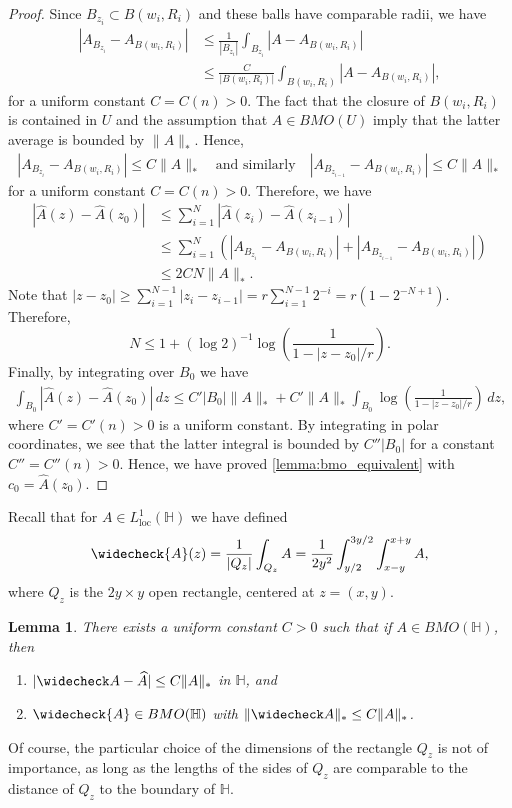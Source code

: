 \documentclass{amsart}
\theoremstyle{plain}
\newtheorem{lemma}[theorem]{Lemma}
\theoremstyle{definition}
\theoremstyle{remark}
\numberwithin{equation}{section}
\numberwithin{theorem}{section}
\numberwithin{conjecture}{section}
\newcommand{\1}{\mathbf 1}
\newcommand{\UHP}{\mathbb H}
\DeclareMathOperator{\loc}{\mathrm{loc}}
\begin{document}
\begin{proof}
Since $B_{z_i}\subset B(w_i,R_i)$ and these balls have comparable radii, we have
\begin{align*}
|A_{B_{z_{i}}}-A_{B(w_i,R_i)}| &\leq \frac{1}{|B_{z_{i}}|} \int_{B_{z_{i}}} |A-A_{B(w_i,R_i)}| \\
&\leq \frac{C}{|B(w_i,R_i)|}\int_{B(w_i,R_i)} |A-A_{B(w_i,R_i)}|,
\end{align*}
for a uniform constant $C=C(n)>0$. The fact that the closure of $B(w_i,R_i)$ is contained in  $U$ and the assumption that $A\in BMO(U)$ imply that the latter average is bounded by $\|A\|_*$. Hence,
\begin{align*}
|A_{B_{z_{i}}}-A_{B(w_i,R_i)}|\leq C \|A\|_{*}\quad \textrm{and similarly}\quad|A_{B_{z_{i-1}}}- A_{B(w_i,R_i)}|\leq C\|A\|_*
\end{align*}
for a uniform constant $C=C(n)>0$. Therefore, we have
\begin{align*}
|\widehat{A}(z)-\widehat{A}(z_0)|&\leq \sum_{i=1}^N |\widehat{A}(z_i)-\widehat{A}(z_{i-1})| \\
&\leq \sum_{i=1}^N(|A_{B_{z_i}}- A_{B(w_i,R_i)}| + |A_{B_{z_{i-1}}}-A_{B(w_i,R_i)}|)\\
&\leq 2CN\|A\|_*.
\end{align*}
Note that $|z-z_0|\geq \sum_{i=1}^{N-1} |z_{i}-z_{i-1}| = r\sum_{i=1}^{N-1}2^{-i}= r(1-2^{-N+1})$. Therefore, 
$$N\leq 1+(\log2)^{-1} \log\left(\frac{1}{1-|z-z_0|/r} \right).$$ 
Finally, by integrating over $B_0$ we have
\begin{align*}
\int_{B_0} |\widehat{A}(z)-\widehat{A}(z_0)| \, dz \leq C'|B_0| \|A\|_* + C' \|A\|_* \int_{B_0} \log\left(\frac{1}{1-|z-z_0|/r} \right) \, dz,
\end{align*}
where $C'=C'(n)>0$ is a uniform constant. By integrating in polar coordinates, we see that the latter integral is bounded by $C''|B_0|$ for a constant $C''=C''(n)>0$. Hence, we have proved \eqref{lemma:bmo_equivalent} with $c_0=\widehat{A}(z_0)$.
\end{proof}

Recall that for $A\in L^1_{\loc}(\UHP)$ we have defined
$$\widecheck{A}(z)= \frac{1}{|Q_z|}\int_{Q_z} A= \frac{1}{2y^2} \int_{y/2}^{3y/2}\int_{x-y}^{x+y} A,$$
where $Q_z$ is the $2y \times y$ open rectangle, centered at $z=(x,y)$. 

\begin{lemma}\label{lemma:bmo_average_rectangle}
There exists a uniform constant $C>0$ such that if $A\in BMO(\UHP)$, then 
\begin{enumerate}[\upshape(i)]
\item $|\widecheck A-\widehat A|\leq C\|A\|_*$ in $\UHP$, and
\item $\widecheck{A}\in BMO(\UHP)$ with $\|\widecheck A\|_*\leq C\|A\|_*$.
\end{enumerate}
\end{lemma}
Of course, the particular choice of the dimensions of the rectangle $Q_z$ is not of importance, as long as the lengths of the sides of $Q_z$ are comparable to the distance of $Q_z$ to the boundary of $\UHP$.
\end{document}
